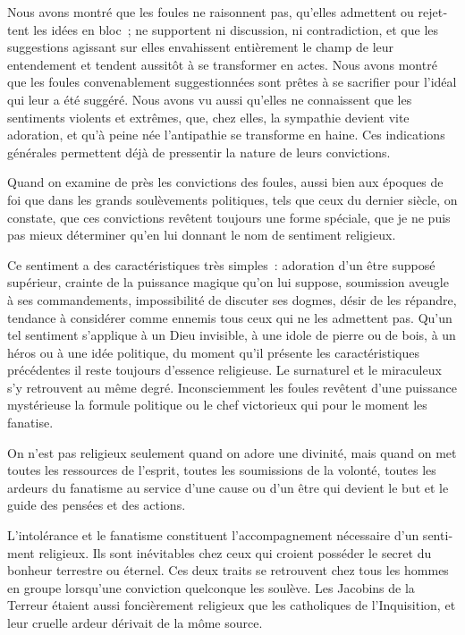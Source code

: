 \documentclass[french,twoside]{book} %
\begin{document}
\noindent Nous avons montré que les foules ne raisonnent pas, qu’elles admettent ou rejet­tent les idées en bloc ; ne supportent ni discussion, ni contradiction, et que les sugges­tions agissant sur elles envahissent entièrement le champ de leur entendement et tendent aussitôt à se transformer en actes. Nous avons montré que les foules conve­nablement suggestionnées sont prêtes à se sacrifier pour l’idéal qui leur a été suggéré. Nous avons vu aussi qu’elles ne connaissent que les sentiments violents et extrêmes, que, chez elles, la sympathie devient vite adoration, et qu’à peine née l’antipathie se transforme en haine. Ces indications générales permettent déjà de pressentir la nature de leurs convictions.\par
Quand on examine de près les convictions des foules, aussi bien aux époques de foi que dans les grands soulèvements politiques, tels que ceux du dernier siècle, on constate, que ces convictions revêtent toujours une forme spéciale, que je ne puis pas mieux déterminer qu’en lui donnant le nom de sentiment religieux.\par
Ce sentiment a des caractéristiques très simples : adoration d’un être supposé supérieur, crainte de la puissance magique qu’on lui suppose, soumission aveugle à ses commandements, impossibilité de discuter ses dogmes, désir de les répandre, ten­dance à considérer comme ennemis tous ceux qui ne les admettent pas. Qu’un tel sentiment s’applique à un Dieu invisible, à une idole de pierre ou de bois, à un héros ou à une idée politique, du moment qu’il présente les caractéristiques précédentes il reste toujours d’essence religieuse. Le surnaturel et le miraculeux s’y retrouvent au même degré. Inconsciemment les foules revêtent d’une puissance mystérieuse la formule politique ou le chef victorieux qui pour le moment les fanatise.\par
On n’est pas religieux seulement quand on adore une divinité, mais quand on met toutes les ressources de l’esprit, toutes les soumissions de la volonté, toutes les ardeurs du fanatisme au service d’une cause ou d’un être qui devient le but et le guide des pensées et des actions.\par
L’intolérance et le fanatisme constituent l’accompagnement nécessaire d’un senti­ment religieux. Ils sont inévitables chez ceux qui croient posséder le secret du bonheur terrestre ou éternel. Ces deux traits se retrouvent chez tous les hommes en groupe lorsqu’une conviction quelconque les soulève. Les Jacobins de la Terreur étaient aussi foncièrement religieux que les catholiques de l’Inquisition, et leur cruelle ardeur dérivait de la môme source.\par
\end{document}
